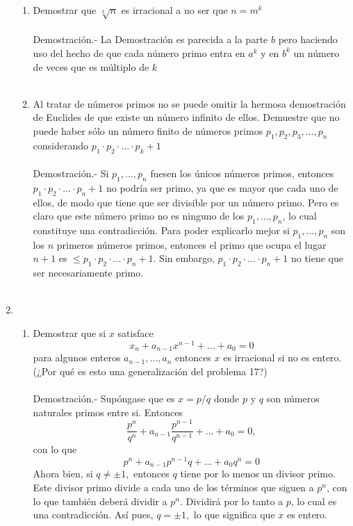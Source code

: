 \begin{enumerate}[\bfseries 1.]
\begin{enumerate}[\bfseries a)]
         \item Demostrar que $\sqrt[k]{n}$ es irracional a no ser que $n=m^k$\\\\
         Demostración.- \; La Demostración es parecida a la parte $b$ pero haciendo uso del hecho de que cada número primo entra en $a^k$ y en $b^k$ un número de veces que es múltiplo de $k$\\\\   

         \item Al tratar de números primos no se puede omitir la hermosa demostración de Euclides de que existe un número infinito de ellos. Demuestre que no puede haber sólo un número finito de números primos $p_1, p_2, p_3,...,p_n$ considerando $p_1\cdot p_2 \cdot ... \cdot p_k + 1$\\\\
         Demostración.- \; Si $p_1,...,p_n$ fuesen los únicos números primos, entonces $p_1 \cdot p_2 \cdot ... \cdot p_n + 1$ no podría ser primo, ya que es mayor que cada uno de ellos, de modo que tiene que ser divisible por un número primo. Pero es claro que este número primo no es ninguno de los $p_1,...,p_n$, lo cual constituye una contradicción. Para poder explicarlo mejor si $p_1,...,p_n$ son los $n$ primeros números primos, entonces el primo que ocupa el lugar $n+1$ es $\leq p_1 \cdot p_2 \cdot ... \cdot p_n+1$. Sin embargo, $p_1\cdot p_2 \cdot ...\cdot p_n + 1$ no tiene que ser necesariamente primo.\\\\       
         \end{enumerate} 

      \item
	 \begin{enumerate}[\bfseries (a)]
	    \item Demostrar que si $x$ satisface
	       $$x_n + a_{n-1}x^{n-1} + ... + a_0 = 0$$
	       para algunos enteros $a_{n-1},...,a_n$ entonces $x$ es irracional si no es entero. (¿Por qué es esto una generalización del problema 17?)\\\\
	       Demostración.- \; Supóngase que es $x=p/q$ donde $p$ y $q$ son números naturales primos entre si. Entonces $$\dfrac{p^n}{q^n} + a_{n-1} \dfrac{p^{n-1}}{q^{n-1}} + ... + a_0 = 0,$$
	       con lo que 
	       $$p^n + a_{n-1} p ^{n-1}q + ... + a_0 q^n = 0$$
	       Ahora bien, si $q \neq \pm 1,$ entonces $q$ tiene por lo menos un divisor primo. Este divisor primo divide a cada uno de los términos que siguen a $p^n$, con lo que también deberá dividir a $p^n$. Dividirá por lo tanto a $p$, lo cual es una contradicción. Así pues, $q= \pm 1,$ lo que significa que $x$ es entero.\\\\


\end{enumerate}
\end{enumerate}
